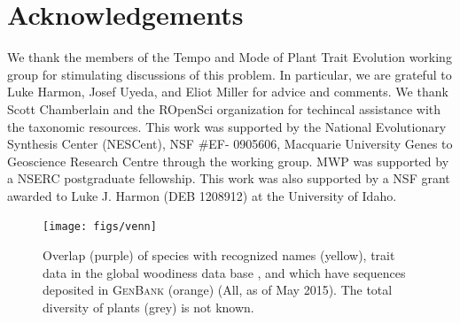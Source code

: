 \documentclass[a4paper,11pt]{article}
\begin{document}
\section{Acknowledgements}
We thank the members of the Tempo and Mode of Plant Trait
Evolution working group for stimulating discussions of this problem. In particular, we are grateful to Luke Harmon, Josef Uyeda, and Eliot Miller for advice and comments. We thank Scott Chamberlain and the ROpenSci organization for techincal assistance with the taxonomic resources. This work was supported by the National Evolutionary Synthesis Center
(NESCent), NSF \#EF- 0905606, Macquarie University Genes to Geoscience
Research Centre through the working group. MWP was supported by a NSERC postgraduate fellowship. This work was also supported by a NSF grant awarded to Luke J. Harmon (DEB 1208912) at the University of Idaho. 


\clearpage




\begin{figure}[p]
\texttt{[image: figs/venn]}
\caption{Overlap (purple) of species with recognized names (yellow), trait data in the global woodiness data base \citep[blue][]{Zanne, FitzJohn2014}, and which have sequences deposited in \textsc{GenBank} (orange) (All, as of May 2015). The total diversity of plants (grey) is not known.}
\label{fig:venn}
\end{figure}
\end{document}

